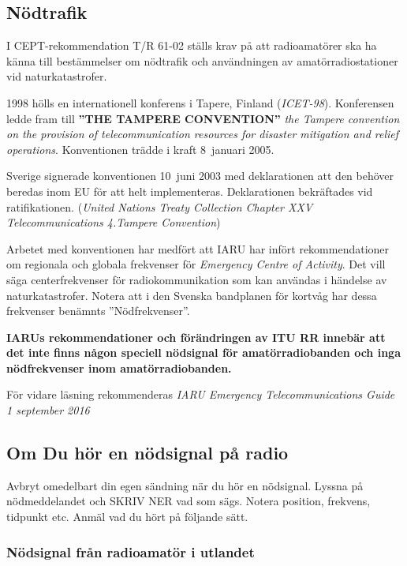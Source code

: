 \subsection{Nödtrafik}

I CEPT-rekommendation T/R 61-02 ställs krav på att radioamatörer ska ha känna
till bestämmelser om nödtrafik och användningen av amatörradiostationer vid
naturkatastrofer.

1998 hölls en internationell konferens i Tapere, Finland (\emph{ICET-98}).
Konferensen ledde fram till \textbf{''THE TAMPERE CONVENTION''} \emph{the
	Tampere convention on the provision of telecommunication resources for disaster
	mitigation and relief operations}. Konventionen trädde i kraft 8~januari 2005.

Sverige signerade konventionen 10~juni 2003 med deklarationen att den behöver
beredas inom EU för att helt implementeras. Deklarationen bekräftades vid
ratifikationen. (\emph{United Nations Treaty Collection Chapter XXV Telecommunications 4.Tampere Convention})

Arbetet med konventionen har medfört att IARU har infört rekommendationer om
regionala och globala frekvenser för \emph{Emergency Centre of Activity}. Det
vill säga centerfrekvenser för radiokommunikation som kan användas i händelse
av naturkatastrofer. Notera att i den Svenska bandplanen för kortvåg har dessa
frekvenser benämnts ''Nödfrekvenser''.

\textbf{IARUs rekommendationer och förändringen av ITU RR innebär att det inte
	finns någon speciell nödsignal för amatörradiobanden och inga nödfrekvenser
	inom amatörradiobanden.}   

För vidare läsning rekommenderas
\emph{IARU Emergency Telecommunications Guide 1 september 2016}

\subsection{Om Du hör en nödsignal på radio}

Avbryt omedelbart din egen sändning när du hör en nödsignal. Lyssna på
nödmeddelandet och SKRIV NER vad som sägs. Notera position, frekvens, tidpunkt
etc. Anmäl vad du hört på följande sätt.

\subsubsection{Nödsignal från radioamatör i utlandet}

